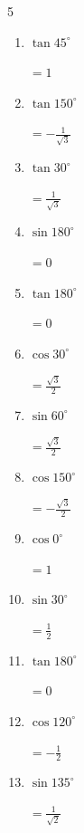 \begin{multicols}{5}
\begin{enumerate}
        $\displaystyle =-\frac{1}{\sqrt{3}}$

  \item $\displaystyle \tan{45^\circ}$

        $\displaystyle =1$

  \item $\displaystyle \tan{150^\circ}$

        $\displaystyle =-\frac{1}{\sqrt{3}}$

  \item $\displaystyle \tan{30^\circ}$

        $\displaystyle =\frac{1}{\sqrt{3}}$

  \item $\displaystyle \sin{180^\circ}$

        $\displaystyle =0$

  \item $\displaystyle \tan{180^\circ}$

        $\displaystyle =0$

  \item $\displaystyle \cos{30^\circ}$

        $\displaystyle =\frac{\sqrt{3}}{2}$

  \item $\displaystyle \sin{60^\circ}$

        $\displaystyle =\frac{\sqrt{3}}{2}$

  \item $\displaystyle \cos{150^\circ}$

        $\displaystyle =-\frac{\sqrt{3}}{2}$

  \item $\displaystyle \cos{0^\circ}$

        $\displaystyle =1$

  \item $\displaystyle \sin{30^\circ}$

        $\displaystyle =\frac{1}{2}$

  \item $\displaystyle \tan{180^\circ}$

        $\displaystyle =0$

  \item $\displaystyle \cos{120^\circ}$

        $\displaystyle =-\frac{1}{2}$

  \item $\displaystyle \sin{135^\circ}$

        $\displaystyle =\frac{1}{\sqrt{2}}$


\end{enumerate}
\end{multicols}
